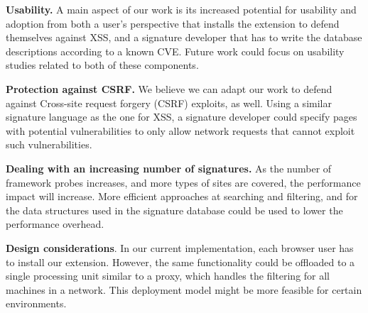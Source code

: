\textbf{Usability.} A main aspect of our work is its increased potential for usability and adoption from both a user's perspective that installs the extension to defend themselves against \ac{XSS}, and a signature developer that has to write the database descriptions according to a known CVE. Future work could focus on usability studies related to both of these components.

\textbf{Protection against CSRF.} We believe we can adapt our work to defend against Cross-site request forgery (CSRF) exploits, as well. Using a similar signature language as the one for \ac{XSS}, a signature developer could specify pages with potential vulnerabilities to only allow network requests that cannot exploit such vulnerabilities. 


\textbf{Dealing with an increasing number of signatures.} As the number of framework probes increases, and more types of sites are covered, the performance impact will increase. More efficient approaches at searching and filtering, and for the data structures used in the signature database could be used to lower the performance overhead.


\textbf{Design considerations}. In our current implementation, each browser user has to install our extension. However, the same functionality could be offloaded to a single processing unit similar to a proxy, which handles the filtering for all machines in a network. This deployment model might be more feasible for certain environments.



